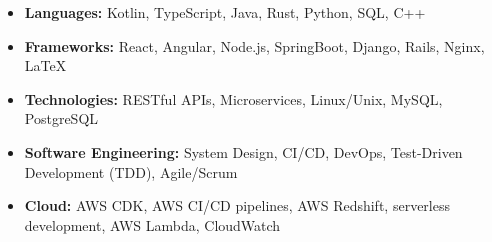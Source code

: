 
\begin{itemize}[leftmargin=16pt,topsep=0pt,itemsep=0.6pt]
  \item \textbf{Languages:} Kotlin, TypeScript, Java, Rust, Python, SQL, C++
  \item \textbf{Frameworks:} React, Angular, Node.js, SpringBoot, Django, Rails, Nginx, LaTeX
  \item \textbf{Technologies:} RESTful APIs, Microservices, Linux/Unix, MySQL, PostgreSQL
  \item \textbf{Software Engineering:} System Design, CI/CD, DevOps, Test-Driven Development (TDD), Agile/Scrum
  \item \textbf{Cloud:} AWS CDK, AWS CI/CD pipelines, AWS Redshift, serverless development, AWS Lambda, CloudWatch
\end{itemize}
\vspace{0.15em}
